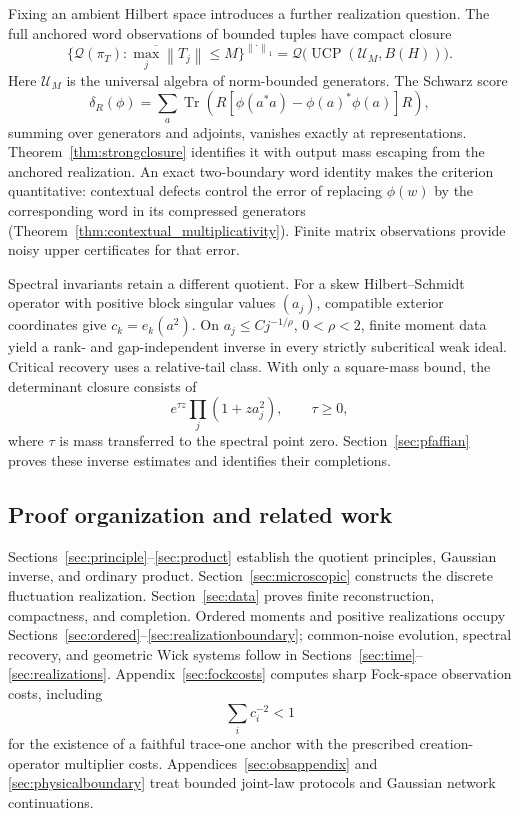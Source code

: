 \documentclass[11pt,a4paper]{amsart}
\numberwithin{equation}{section}
\theoremstyle{definition}
\theoremstyle{remark}
\DeclareMathOperator{\UCP}{UCP}
\DeclareMathOperator{\Tr}{Tr}
\newcommand{\norm}[1]{\left\lVert#1\right\rVert}
\begin{document}
Fixing an ambient Hilbert space introduces a further realization question. The full anchored word observations of bounded tuples have compact closure
\[
 \overline{\{\mathcal Q(\pi_T):\max_j\norm{T_j}\le M\}}^{\norm\cdot_1}
 =\mathcal Q\bigl(\UCP(\mathcal U_M,B(H))\bigr).
\]
Here $\mathcal U_M$ is the universal algebra of norm-bounded generators. The Schwarz score
\[
 \delta_R(\phi)=\sum_a\Tr\!\left(R[\phi(a^*a)-\phi(a)^*\phi(a)]R\right),
\]
summing over generators and adjoints, vanishes exactly at representations. Theorem~\ref{thm:strongclosure} identifies it with output mass escaping from the anchored realization. An exact two-boundary word identity makes the criterion quantitative: contextual defects control the error of replacing $\phi(w)$ by the corresponding word in its compressed generators (Theorem~\ref{thm:contextual_multiplicativity}). Finite matrix observations provide noisy upper certificates for that error.

Spectral invariants retain a different quotient. For a skew Hilbert--Schmidt operator with positive block singular values $(a_j)$, compatible exterior coordinates give $c_k=e_k(a^2)$. On $a_j\le Cj^{-1/\rho}$, $0<\rho<2$, finite moment data yield a rank- and gap-independent inverse in every strictly subcritical weak ideal. Critical recovery uses a relative-tail class. With only a square-mass bound, the determinant closure consists of
\[
 e^{\tau z}\prod_j(1+za_j^2),\qquad\tau\ge0,
\]
where $\tau$ is mass transferred to the spectral point zero. Section~\ref{sec:pfaffian} proves these inverse estimates and identifies their completions.

\subsection{Proof organization and related work}
Sections~\ref{sec:principle}--\ref{sec:product} establish the quotient principles, Gaussian inverse, and ordinary product. Section~\ref{sec:microscopic} constructs the discrete fluctuation realization. Section~\ref{sec:data} proves finite reconstruction, compactness, and completion. Ordered moments and positive realizations occupy Sections~\ref{sec:ordered}--\ref{sec:realizationboundary}; common-noise evolution, spectral recovery, and geometric Wick systems follow in Sections~\ref{sec:time}--\ref{sec:realizations}. Appendix~\ref{sec:fockcosts} computes sharp Fock-space observation costs, including
\begin{equation}\label{eq:intro_branch}
 \sum_i c_i^{-2}<1
\end{equation}
for the existence of a faithful trace-one anchor with the prescribed creation-operator multiplier costs. Appendices~\ref{sec:obsappendix} and \ref{sec:physicalboundary} treat bounded joint-law protocols and Gaussian network continuations.
\end{document}
